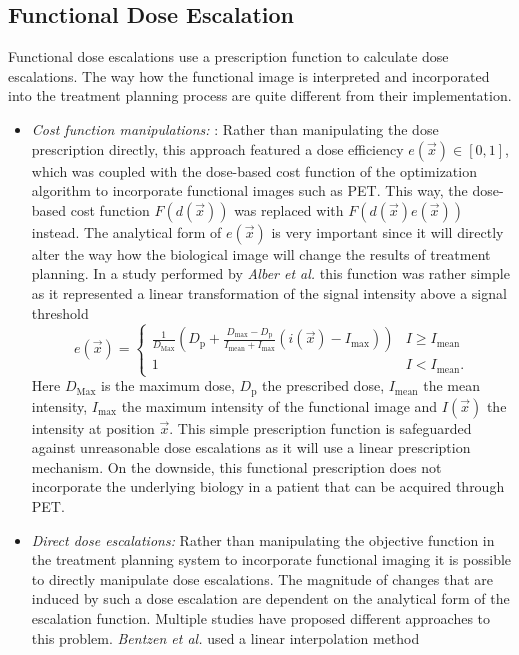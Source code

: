 \subsection{Functional Dose Escalation}
Functional dose escalations use a prescription function to calculate dose escalations. The way how the functional image is interpreted and incorporated into the treatment planning process are quite different from their implementation.
\begin{itemize}
\item \textit{Cost function manipulations: }:  Rather than manipulating the dose prescription directly, this approach featured a dose efficiency $e(\vec x)\in[0,1]$, which was coupled with the dose-based cost function of the optimization algorithm to incorporate functional images such as PET. This way, the dose-based cost function $F(d(\vec x))$ was replaced with $F(d(\vec x)e(\vec x))$ instead. The analytical form of $e(\vec x)$ is very important since it will directly alter the way how the biological image will change the results of treatment planning. In a study performed by \textit{Alber et al.} \cite{pmid12587912} this function was rather simple as it represented a linear transformation of the signal intensity above a signal threshold
\begin{equation}\label{eq:alber}
e(\vec x) = 
\begin{cases}
\frac{1}{D_{\mathrm{Max}}}\left(D_{\mathrm{p}} +\frac{D_{\mathrm{max}}-D_{\mathrm{p}}}{I_{\mathrm{mean}}+I_{\mathrm{max}}}(i(\vec x)-I_{\mathrm{max}})\right) & I\geq I_{\mathrm{mean}}\\
1 & I< I_{\mathrm{mean}}.
\end{cases}
\end{equation}
Here $D_{\mathrm{Max}}$ is the maximum dose, $D_{\mathrm{p}}$ the prescribed dose, $I_{\mathrm{mean}}$ the mean intensity, $I_{\mathrm{max}}$  the maximum intensity of the functional image and $I(\vec x)$ the intensity at position $\vec x$. This simple prescription function is safeguarded against unreasonable dose escalations as it will use a linear prescription mechanism. On the downside, this functional prescription does not incorporate the underlying biology in a patient that can be acquired through PET.
\item \textit{Direct dose escalations: }Rather than manipulating the objective function in the treatment planning system to incorporate functional imaging it is possible to directly manipulate dose escalations. The magnitude of changes that are induced by such a dose escalation are dependent on the analytical form of the escalation function. Multiple studies have proposed different approaches to this problem. \textit{Bentzen et al.}\cite{pmid21356478} used a linear interpolation method

\end{itemize}
